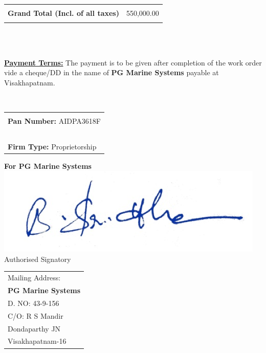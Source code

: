 \documentclass[11pt,a4]{article}
\begin{document}
\hspace*{9cm}
\begin{tabular}{|c|r|}
\hline
& \\
{\bf Grand Total (Incl. of all taxes)} & 550,000.00 \\
& \\
\hline
\end{tabular}\\  \\
\indent \parbox{3.3in}{ \vspace*{-1.5cm} {\bf \underline{Payment Terms:}}  The payment is to be given after completion of the work order vide a cheque/DD in the name of {\bf PG Marine Systems} payable at Visakhapatnam.}\\
 \hspace*{.25cm} \begin{tabular}{l}
\parbox{3in}{}   \\ {\noindent \bf Pan Number:}  AIDPA3618F \\ \   \\
 {\bf Firm Type:} Proprietorship \\
\end{tabular}
\vspace*{25pt}

\vspace*{45pt}


{\bf For PG Marine Systems} \\ 
\hspace*{.5cm}\includegraphics{signharsh}\\
 \hspace*{0.6cm}Authorised Signatory
\vspace*{-72pt}
\begin{flushright}
\begin{tabular}{l}
Mailing Address:\\
{\bf PG Marine Systems}\\
D. NO: 43-9-156\\
C/O: R S Mandir\\
Dondaparthy JN\\ 
Visakhapatnam-16\\
\end{tabular}
\end{flushright}
\end{document}
